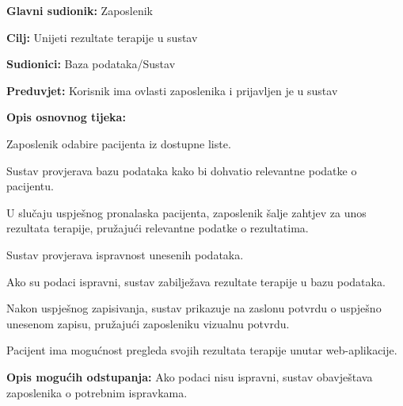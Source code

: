                 \noindent {}
					\begin{packed_item}
	
						\item \textbf{Glavni sudionik: }Zaposlenik
						\item  \textbf{Cilj:} Unijeti rezultate terapije u sustav
						\item  \textbf{Sudionici:} Baza podataka/Sustav
						\item  \textbf{Preduvjet:} Korisnik ima ovlasti zaposlenika i prijavljen je u sustav
						\item  \textbf{Opis osnovnog tijeka:}
						
						\item[] \begin{packed_enum}
	
							\item Zaposlenik odabire pacijenta iz dostupne liste.
							\item Sustav provjerava bazu podataka kako bi dohvatio relevantne podatke o pacijentu.
							\item U slučaju uspješnog pronalaska pacijenta, zaposlenik šalje zahtjev za unos rezultata terapije, pružajući relevantne podatke o rezultatima.
							\item Sustav provjerava ispravnost unesenih podataka.
							\item Ako su podaci ispravni, sustav zabilježava rezultate terapije u bazu podataka.
							\item Nakon uspješnog zapisivanja, sustav prikazuje na zaslonu potvrdu o uspješno unesenom zapisu, pružajući zaposleniku vizualnu potvrdu.
							\item Pacijent ima mogućnost pregleda svojih rezultata terapije unutar web-aplikacije.
	
						\end{packed_enum}
						
						\item  \textbf{Opis mogućih odstupanja:} Ako podaci nisu ispravni, sustav obavještava zaposlenika o potrebnim ispravkama.
						
						
					\end{packed_item}

